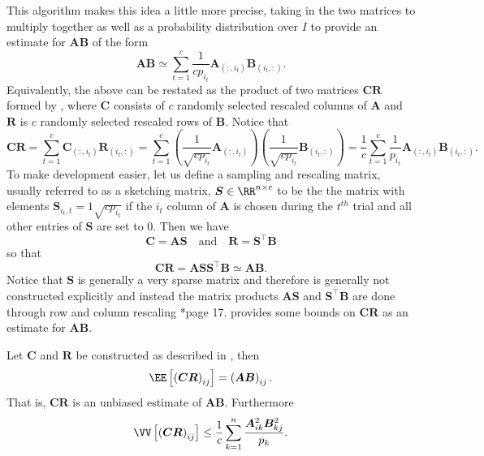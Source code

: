 This algorithm makes this idea a little more precise, taking in the two matrices to multiply together as well as a probability distribution over $I$ to provide an estimate for $\bm{A}\bm{B}$ of the form
\begin{equation*}
    \bm{A}\bm{B} \simeq \sum_{t=1}^{c} \frac{1}{cp_{i_t}} \bm{A}_{(:,i_t)} \bm{B}_{(i_t,:)}.
\end{equation*}
Equivalently, the above can be restated as the product of two matrices $\bm{C} \bm{R}$ formed by , where $\bm{C}$ consists of $c$ randomly selected rescaled columns of $\bm{A}$ and $\bm{R}$ is $c$ randomly selected rescaled rows of $\bm{B}$. Notice that
\begin{equation*}
    \bm{C} \bm{R} = \sum_{t=1}^{c} \bm{C}_{(:,i_t)} \bm{R}_{(i_t,:)} = \sum_{t=1}^{c} \left( \frac{1}{\sqrt{cp_{i_t}}} \bm{A}_{(:,i_t)} \right) \left( \frac{1}{\sqrt{cp_{i_t}}} \bm{B}_{(i_t,:)} \right) = \frac{1}{c} \sum_{t=1}^{c} \frac{1}{p_{i_t}} \bm{A}_{(:,i_t)} \bm{B}_{(i_t,:)}.
\end{equation*}
To make development easier, let us define a sampling and rescaling matrix, usually referred to as a sketching matrix, $\bm{S} \in \RR^{n \times c}$ to be the the matrix with elements $\bm{S}_{i_t , t} = 1 \sqrt{c p_{i_t}}$ if the $i_t$ column of $\bm{A}$ is chosen during the $t^{th}$ trial and all other entries of $\bm{S}$ are set to $0$. Then we have
\begin{equation*}
    \bm{C} = \bm{A} \bm{S} \quad \text{and} \quad \bm{R} = \bm{S}^{\intercal} \bm{B}
\end{equation*}
so that
\begin{equation} \label{eq: nys-sketch-apprx}
    \bm{C} \bm{R} = \bm{A} \bm{S} \bm{S}^{\intercal} \bm{B} \simeq \bm{A} \bm{B}.
\end{equation}
Notice that $\bm{S}$ is generally a very sparse matrix and therefore is generally not constructed explicitly and instead the matrix products $\bm{A} \bm{S}$ and $\bm{S}^{\intercal} \bm{B}$ are done through row and column rescaling \cite{drineas2017lectures}*{page 17}.  provides some bounds on $\bm{C} \bm{R}$ as an estimate for $\bm{A}\bm{B}$.

\begin{lem} \label{lem: rmm-exp-var-bds}
    Let $\bm{C}$ and $\bm{R}$ be constructed as described in , then
    \[
        \EE \left[ \left( \bm{C} \bm{R} \right)_{ij} \right] = \left( \bm{A}\bm{B} \right)_{ij}.
    \]
    That is, $\bm{C} \bm{R}$ is an unbiased estimate of $\bm{A}\bm{B}$. Furthermore
    \[
        \VV \left[ \left( \bm{C} \bm{R} \right)_{ij} \right] \leq \frac{1}{c} \sum_{k=1}^{n} \frac{\bm{A}_{ik}^2 \bm{B}_{kj}^2}{p_k}.
    \]
\end{lem}

